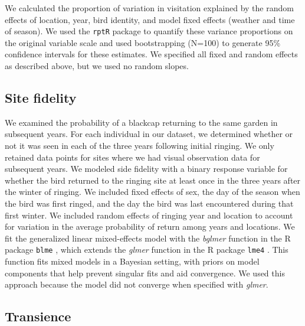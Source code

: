 \documentclass[a4paper, twoside]{templates/ociamthesis}
\begin{document}
We calculated the proportion of variation in visitation explained by the random effects of location, year, bird identity, and model fixed effects (weather and time of season). We used the \texttt{rptR} package \autocite{stoffelRptRRepeatabilityEstimation2017} to quantify these variance proportions on the original variable scale and used bootstrapping (N=100) to generate 95\% confidence intervals for these estimates. We specified all fixed and random effects as described above, but we used no random slopes.

\hypertarget{site-fidelity}{%
\subsection{Site fidelity}\label{site-fidelity}}

We examined the probability of a blackcap returning to the same garden in subsequent years. For each individual in our dataset, we determined whether or not it was seen in each of the three years following initial ringing. We only retained data points for sites where we had visual observation data for subsequent years. We modeled side fidelity with a binary response variable for whether the bird returned to the ringing site at least once in the three years after the winter of ringing. We included fixed effects of sex, the day of the season when the bird was first ringed, and the day the bird was last encountered during that first winter. We included random effects of ringing year and location to account for variation in the average probability of return among years and locations. We fit the generalized linear mixed-effects model with the \emph{bglmer} function in the R package \texttt{blme} \autocite{chungNondegeneratePenalizedLikelihood2013}, which extends the \emph{glmer} function in the R package \texttt{lme4} \autocite{batesFittingLinearMixedeffects2015}. This function fits mixed models in a Bayesian setting, with priors on model components that help prevent singular fits and aid convergence. We used this approach because the model did not converge when specified with \emph{glmer}.

\hypertarget{transience}{%
\subsection{Transience}\label{transience}}
\end{document}
